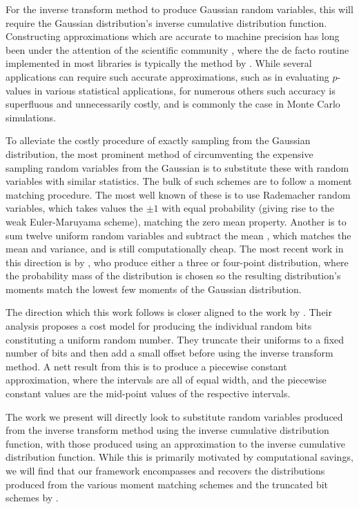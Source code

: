 \documentclass[manuscript,review]{acmart}
\begin{document}
For the inverse transform method to produce Gaussian random variables, this will require the Gaussian distribution's inverse cumulative distribution function. Constructing approximations which are accurate to machine precision has long been under the attention of the scientific community \citep{hastings1955approximations,evans1974algorithm70,beasley1985percentage,wichura1988algorithm,marsaglia1994rapid,giles2011approximating}, where the de facto routine implemented in most libraries is typically the method by \citet{wichura1988algorithm}. While several applications can require such accurate approximations, such as in evaluating $ p $-values in various statistical applications, for numerous others such accuracy is superfluous and unnecessarily costly, and is commonly the case in Monte Carlo simulations. 

To alleviate the costly procedure of exactly sampling from the Gaussian distribution, the most prominent method of circumventing the expensive sampling random variables from the Gaussian is to substitute these with random variables with similar statistics. The bulk of such schemes are to follow a moment matching procedure. The most well known of these is to use Rademacher random variables, which takes values the $ \pm 1 $ with equal probability \citep[page~XXXII]{kloeden1999numerical} (giving rise to the weak Euler-Maruyama scheme), matching the zero mean property. Another is to sum twelve uniform random variables and subtract the mean \citep[page~500]{munk2011fixed}, which matches the mean and variance, and is still computationally cheap. The most recent work in this direction is by \citet{muller2015improving}, who produce either a three or four-point distribution, where the probability mass of the distribution is chosen so the resulting distribution's moments match the lowest few moments of the Gaussian distribution. 

The direction which this work follows is closer aligned to the work by \citet{giles2019random_quadrature,giles2019random_multilevel}. Their analysis proposes a cost model for producing the individual random bits constituting a uniform random number. They truncate their uniforms to a fixed number of bits and then add a small offset before using the inverse transform method. A nett result from this is to produce a piecewise constant approximation, where the intervals are all of equal width, and the piecewise constant values are the mid-point values of the respective intervals. 

The work we present will directly look to substitute random variables produced from the inverse transform method using the inverse cumulative distribution function, with those produced using an approximation to the inverse cumulative distribution function. While this is primarily motivated by computational savings, we will find that our framework encompasses and recovers the distributions produced from the various moment matching schemes and the truncated bit schemes by \citet{giles2019random_quadrature,giles2019random_multilevel}. 
\end{document}
